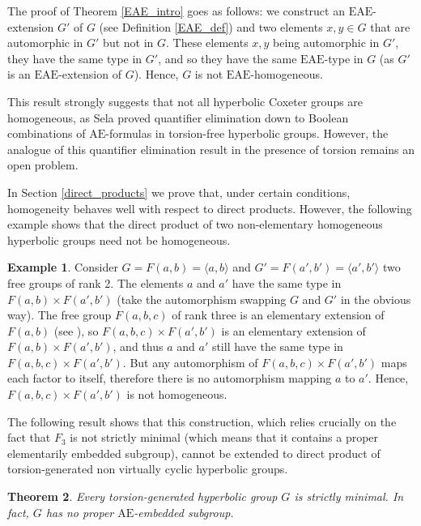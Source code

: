 \documentclass[a4paper, 11pt]{amsart}
\newtheorem{te}{Theorem}[section]
\theoremstyle{definition}
\newtheorem{ex}[te]{Example}
\theoremstyle{remark}
\begin{document}
The proof of Theorem \ref{EAE_intro} goes as follows: we construct an $\mathrm{EAE}$-extension $G'$ of $G$ (see Definition \ref{EAE_def}) and two elements $x,y\in G$ that are automorphic in $G'$ but not in $G$. These elements $x,y$ being automorphic in $G'$, they have the same type in $G'$, and so they have the same $\mathrm{EAE}$-type in $G$ (as $G'$ is an $\mathrm{EAE}$-extension of $G$). Hence, $G$ is not $\mathrm{EAE}$-homogeneous.

\smallskip

This result strongly suggests that not all hyperbolic Coxeter groups are homogeneous, as Sela proved quantifier elimination down to Boolean combinations of $\mathrm{AE}$-formulas in torsion-free hyperbolic groups. However, the analogue of this quantifier elimination result in the presence of torsion remains an open problem.

\smallskip

In Section \ref{direct_products} we prove that, under certain conditions, homogeneity behaves well with respect to direct products. However, the following example shows that the direct product of two non-elementary homogeneous hyperbolic groups need not be homogeneous. 

\begin{ex}Consider $G=F(a,b)=\langle a,b\rangle$ and $G'=F(a',b')=\langle a',b'\rangle$ two free groups of rank 2. The elements $a$ and $a'$ have the same type in $F(a,b)\times F(a',b')$ (take the automorphism swapping $G$ and $G'$ in the obvious way). The free group $F(a,b,c)$ of rank three is an elementary extension of $F(a,b)$ (see \cite{Sel06,KM06}), so $F(a,b,c)\times F(a',b')$ is an elementary extension of $F(a,b)\times F(a',b')$, and thus $a$ and $a'$ still have the same type in $F(a,b,c)\times F(a',b')$. But any automorphism of $F(a,b,c)\times F(a',b')$ maps each factor to itself, therefore there is no automorphism mapping $a$ to $a'$. Hence, $F(a,b,c)\times F(a',b')$ is not homogeneous. \end{ex}

The following result shows that this construction, which relies crucially on the fact that $F_3$ is not strictly minimal (which means that it contains a proper elementarily embedded subgroup), cannot be extended to direct product of torsion-generated non virtually cyclic hyperbolic groups.

\begin{te}\label{strictly_minimal_intro}Every torsion-generated hyperbolic group $G$ is strictly minimal. In fact, $G$ has no proper $\mathrm{AE}$-embedded subgroup.\end{te}
\end{document}
